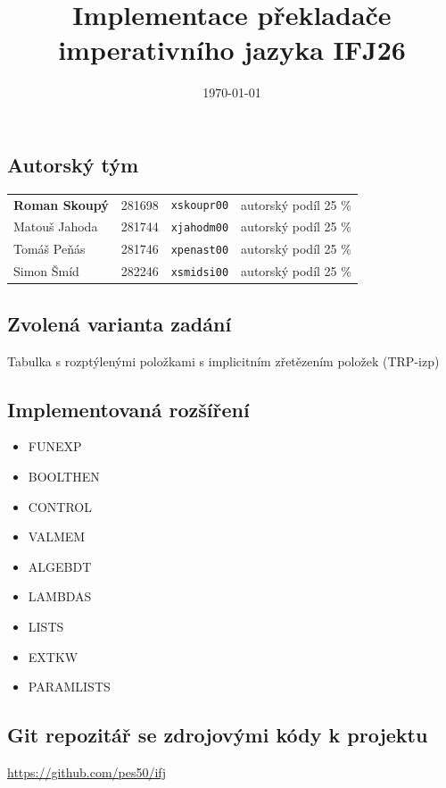 \documentclass{article}
\title{\textbf{Implementace překladače \\
       imperativního jazyka IFJ26}}
\date{\today}
\begin{document}
    \maketitle
    \thispagestyle{empty}

    \subsection*{Autorský tým}
        \begin{tabular}{l l l l}
            \textbf{Roman Skoupý} & 281698 & \verb|xskoupr00| & autorský podíl 25 \%\\
            Matouš Jahoda & 281744 & \verb|xjahodm00| & autorský podíl 25 \%\\
            Tomáš Peňás & 281746 & \verb|xpenast00| & autorský podíl 25 \%\\
            Simon Šmíd & 282246 & \verb|xsmidsi00| & autorský podíl 25 \%\\
        \end{tabular}
        
    \subsection*{Zvolená varianta zadání}
        Tabulka s rozptýlenými položkami s implicitním zřetězením položek (TRP-izp)
        
    \subsection*{Implementovaná rozšíření}
        \begin{itemize}
            \item FUNEXP
            \item BOOLTHEN
            \item CONTROL
            \item VALMEM
            \item ALGEBDT
            \item LAMBDAS
            \item LISTS
            \item EXTKW
            \item PARAMLISTS
        \end{itemize}
        
    \subsection*{Git repozitář se zdrojovými kódy k projektu}
        \url{https://github.com/pes50/ifj}
        
\end{document}
